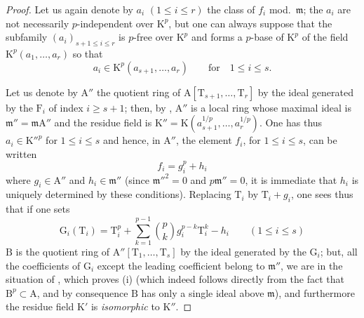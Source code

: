 \begin{proof}
Let us again denote by $a_i$ $(1\leq i\leq r)$ the class of $f_i$ mod.~$\mathfrak{m}$; the $a_i$ are not necessarily $p$-independent over $\mathrm{K}^p$, but one can always suppose that the subfamily $(a_i)_{s+1\leq i\leq r}$ is $p$-free over $\mathrm{K}^p$ and forms a $p$-base of $\mathrm{K}^p$ of the field $\mathrm{K}^p(a_1,\ldots,a_r)$ so that
\[
  a_i\in\mathrm{K}^p(a_{s+1},\ldots,a_r)\qquad\text{for}\quad 1\leq i\leq s.
\]

Let us denote by $\mathrm{A}''$ the quotient ring of $\mathrm{A}[\mathrm{T}_{s+1},\ldots,\mathrm{T}_r]$ by the ideal generated by the $\mathrm{F}_i$ of index $i\geq s+1$; then, by , $\mathrm{A}''$ is a local ring whose maximal ideal is $\mathfrak{m}''=\mathfrak{m}\mathrm{A}''$ and the residue field is $\mathrm{K}''=\mathrm{K}(a_{s+1}^{1/p},\ldots,a_r^{1/p})$.
One has thus $a_i\in\mathrm{K}''^p$ for $1\leq i\leq s$ and hence, in $\mathrm{A}''$, the element $f_i$, for $1\leq i\leq s$, can be written
\[
\label{0.22.4.7.3}
  f_i=g_i^p+h_i
  \tag{22.4.7.3}
\]
where $g_i\in\mathrm{A}''$ and $h_i\in\mathfrak{m}''$ (since $\mathfrak{m}''^2=0$ and $p\mathfrak{m}''=0$, it is immediate that $h_i$ is uniquely determined by these conditions).
Replacing $\mathrm{T}_i$ by $\mathrm{T}_i+g_i$, one sees thus that if one sets
\[
  \mathrm{G}_i(\mathrm{T}_i)=\mathrm{T}_i^p+\sum_{k=1}^{p-1}\binom{p}{k}g_i^{p-k}\mathrm{T}_i^k-h_i\qquad(1\leq i\leq s)
\]
$\mathrm{B}$ is the quotient ring of $\mathrm{A}''[\mathrm{T}_1,\ldots,\mathrm{T}_s]$ by the ideal generated by the $\mathrm{G}_i$; but, all the coefficients of $\mathrm{G}_i$ except the leading coefficient belong to $\mathfrak{m}''$, we are in the situation of , which proves (i) (which indeed follows directly from the fact that $\mathrm{B}^p\subset\mathrm{A}$, and by consequence $\mathrm{B}$ has only a single ideal above $\mathfrak{m}$), and furthermore the residue field $\mathrm{K}'$ is \emph{isomorphic} to $\mathrm{K}''$.


\end{proof}
